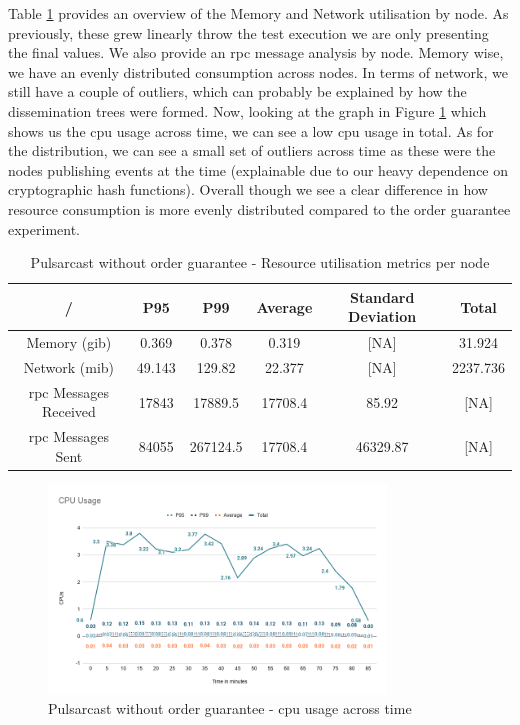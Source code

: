 Table \ref{table:pulsarcast} provides an overview of the Memory and Network
utilisation by node. As previously, these grew linearly throw the test
execution we are only presenting the final values. We also provide an
\acrshort{rpc} message analysis by node. Memory wise, we have an evenly
distributed consumption across nodes. In terms of network, we still have a
couple of outliers, which can probably be explained by how the dissemination
trees were formed.  Now, looking at the graph in Figure
\ref{fig:graph-pulsarcast-cpu} which shows us the \acrshort{cpu} usage across
time, we can see a low \acrshort{cpu} usage in total. As for the distribution,
we can see a small set of outliers across time as these were the nodes
publishing events at the time (explainable due to our heavy dependence on
cryptographic hash functions).  Overall though we see a clear difference in how
resource consumption is more evenly distributed compared to the order guarantee
experiment.

\begin{table}[!htb]
\caption{Pulsarcast without order guarantee - Resource utilisation metrics per node}
\label{table:pulsarcast}
  \begin{center}
   \begin{tabular}{|c| c c c c c|} 
   \hline
   / & P95 & P99 & Average & Standard Deviation & Total \\ [0.5ex] 
   \hline\hline
   Memory (\acrshort{gib}) & 0.369 & 0.378 & 0.319 & [NA] & 31.924 \\
   \hline
   Network (\acrshort{mib}) & 49.143 & 129.82 & 22.377 & [NA] & 2237.736 \\
   \hline
   \acrshort{rpc} Messages Received & 17843 & 17889.5 & 17708.4 & 85.92 & [NA] \\
   \hline
   \acrshort{rpc} Messages Sent & 84055 & 267124.5 & 17708.4 & 46329.87 & [NA] \\ [1ex] 
   \hline
  \end{tabular}
  \end{center}
\end{table}

\begin{figure}[!htb]
  \centering
  \includegraphics[width=0.8\textwidth]{../images/graph-pulsarcast-cpu.png}
  \caption{Pulsarcast without order guarantee - \acrshort{cpu} usage across time}
  \label{fig:graph-pulsarcast-cpu}
\end{figure}

